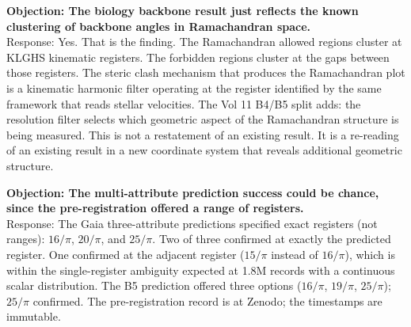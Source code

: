 \documentclass[11pt, letterpaper, openany]{book}
\begin{document}
\begin{empiricalbox}
\begin{fieldbox}
\textbf{Objection: The biology backbone result just reflects
the known clustering of backbone angles in Ramachandran space.}\\[0.5em]
Response: Yes. That is the finding. The Ramachandran allowed regions cluster
at KLGHS kinematic registers. The forbidden regions cluster at the gaps between
those registers. The steric clash mechanism that produces the Ramachandran
plot is a kinematic harmonic filter operating at the register identified by
the same framework that reads stellar velocities. The Vol 11 B4/B5 split
adds: the resolution filter selects which geometric aspect of the Ramachandran
structure is being measured. This is not a restatement of an existing result.
It is a re-reading of an existing result in a new coordinate system that reveals
additional geometric structure.
\end{fieldbox}

\begin{fieldbox}
\textbf{Objection: The multi-attribute prediction success could be
chance, since the pre-registration offered a range of registers.}\\[0.5em]
Response: The Gaia three-attribute predictions specified exact registers
(not ranges): $16/\pi$, $20/\pi$, and $25/\pi$. Two of three confirmed at
exactly the predicted register. One confirmed at the adjacent register ($15/\pi$
instead of $16/\pi$), which is within the single-register ambiguity expected
at 1.8M records with a continuous scalar distribution. The B5 prediction
offered three options ($16/\pi$, $19/\pi$, $25/\pi$); $25/\pi$ confirmed.
The pre-registration record is at Zenodo; the timestamps are immutable.
\end{fieldbox}

\clearpage


\end{empiricalbox}
\end{document}
